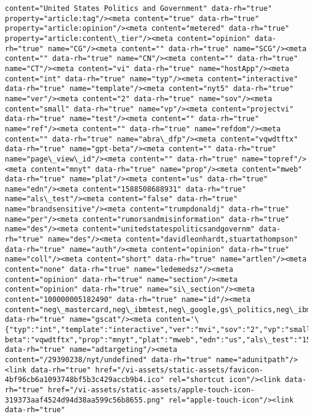 \documentclass[11pt]{article}
\begin{document}
\begin{Verbatim}[commandchars=\\\{\}]
content="United States Politics and Government" data-rh="true" property="article:tag"/><meta content="true" data-rh="true" property="article:opinion"/><meta content="metered" data-rh="true" property="article:content\_tier"/><meta content="opinion" data-rh="true" name="CG"/><meta content="" data-rh="true" name="SCG"/><meta content="" data-rh="true" name="CN"/><meta content="" data-rh="true" name="CT"/><meta content="vi" data-rh="true" name="hostApp"/><meta content="int" data-rh="true" name="typ"/><meta content="interactive" data-rh="true" name="template"/><meta content="nyt5" data-rh="true" name="ver"/><meta content="2" data-rh="true" name="sov"/><meta content="small" data-rh="true" name="vp"/><meta content="projectvi" data-rh="true" name="test"/><meta content="" data-rh="true" name="ref"/><meta content="" data-rh="true" name="refdom"/><meta content="" data-rh="true" name="abra\_dfp"/><meta content="vqwdtftx" data-rh="true" name="gpt-beta"/><meta content="" data-rh="true" name="page\_view\_id"/><meta content="" data-rh="true" name="topref"/><meta content="mnyt" data-rh="true" name="prop"/><meta content="mweb" data-rh="true" name="plat"/><meta content="us" data-rh="true" name="edn"/><meta content="1588508688931" data-rh="true" name="als\_test"/><meta content="false" data-rh="true" name="brandsensitive"/><meta content="trumpdonaldj" data-rh="true" name="per"/><meta content="rumorsandmisinformation" data-rh="true" name="des"/><meta content="unitedstatespoliticsandgovernm" data-rh="true" name="des"/><meta content="davidleonhardt,stuartathompson" data-rh="true" name="auth"/><meta content="opinion" data-rh="true" name="coll"/><meta content="short" data-rh="true" name="artlen"/><meta content="none" data-rh="true" name="ledemedsz"/><meta content="opinion" data-rh="true" name="section"/><meta content="opinion" data-rh="true" name="si\_section"/><meta content="100000005182490" data-rh="true" name="id"/><meta content="neg\_mastercard,neg\_ibmtest,neg\_google,gs\_politics,neg\_ibm,neg\_hearts,gs\_politics\_misc,gs\_politics\_american,neg\_orep,neg\_bp,neg\_cathay,gs\_finance,neg\_mktg\_safe\_q4\_2019,gv\_safe,gs\_t" data-rh="true" name="gscat"/><meta content='\{"typ":"int","template":"interactive","ver":"mvi","sov":"2","vp":"small","test":"projectvi","ref":"","refdom":"","abra\_dfp":"","gpt-beta":"vqwdtftx","prop":"mnyt","plat":"mweb","edn":"us","als\_test":"1588508688931","brandsensitive":"false","per":"trumpdonaldj","des":"rumorsandmisinformation,unitedstatespoliticsandgovernm","auth":"davidleonhardt,stuartathompson","coll":"opinion","artlen":"short","ledemedsz":"none","section":"opinion","si\_section":"opinion","id":"100000005182490","gscat":"neg\_mastercard,neg\_ibmtest,neg\_google,gs\_politics,neg\_ibm,neg\_hearts,gs\_politics\_misc,gs\_politics\_american,neg\_orep,neg\_bp,neg\_cathay,gs\_finance,neg\_mktg\_safe\_q4\_2019,gv\_safe,gs\_t"\}' data-rh="true" name="adtargeting"/><meta content="/29390238/nyt/undefined" data-rh="true" name="adunitpath"/><link data-rh="true" href="/vi-assets/static-assets/favicon-4bf96cb6a1093748bf5b3c429accb9b4.ico" rel="shortcut icon"/><link data-rh="true" href="/vi-assets/static-assets/apple-touch-icon-319373aaf4524d94d38aa599c56b8655.png" rel="apple-touch-icon"/><link data-rh="true" 
\end{Verbatim}
\end{document}
